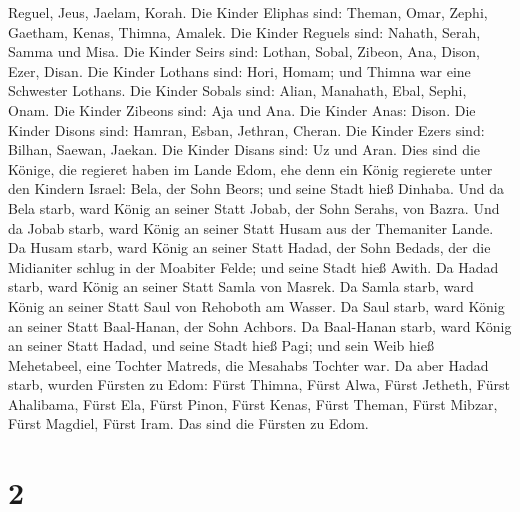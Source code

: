 Reguel, Jeus, Jaelam, Korah.  Die Kinder Eliphas sind:
Theman, Omar, Zephi, Gaetham, Kenas, Thimna, Amalek.  Die
Kinder Reguels sind: Nahath, Serah, Samma und Misa.  Die
Kinder Seirs sind: Lothan, Sobal, Zibeon, Ana, Dison, Ezer, Disan.
 Die Kinder Lothans sind: Hori, Homam; und Thimna war eine
Schwester Lothans.  Die Kinder Sobals sind: Alian,
Manahath, Ebal, Sephi, Onam. Die Kinder Zibeons sind: Aja und Ana.
 Die Kinder Anas: Dison. Die Kinder Disons sind: Hamran,
Esban, Jethran, Cheran.  Die Kinder Ezers sind: Bilhan,
Saewan, Jaekan. Die Kinder Disans sind: Uz und Aran.  Dies
sind die Könige, die regieret haben im Lande Edom, ehe denn ein König
regierete unter den Kindern Israel: Bela, der Sohn Beors; und seine
Stadt hieß Dinhaba.  Und da Bela starb, ward König an
seiner Statt Jobab, der Sohn Serahs, von Bazra.  Und da
Jobab starb, ward König an seiner Statt Husam aus der Themaniter Lande.
 Da Husam starb, ward König an seiner Statt Hadad, der Sohn
Bedads, der die Midianiter schlug in der Moabiter Felde; und seine Stadt
hieß Awith.  Da Hadad starb, ward König an seiner Statt
Samla von Masrek.  Da Samla starb, ward König an seiner
Statt Saul von Rehoboth am Wasser.  Da Saul starb, ward
König an seiner Statt Baal-Hanan, der Sohn Achbors.  Da
Baal-Hanan starb, ward König an seiner Statt Hadad, und seine Stadt hieß
Pagi; und sein Weib hieß Mehetabeel, eine Tochter Matreds, die Mesahabs
Tochter war.  Da aber Hadad starb, wurden Fürsten zu Edom:
Fürst Thimna, Fürst Alwa, Fürst Jetheth,  Fürst Ahalibama,
Fürst Ela, Fürst Pinon,  Fürst Kenas, Fürst Theman, Fürst
Mibzar,  Fürst Magdiel, Fürst Iram. Das sind die Fürsten zu
Edom.

\hypertarget{section-1}{%
\section{2}\label{section-1}}

